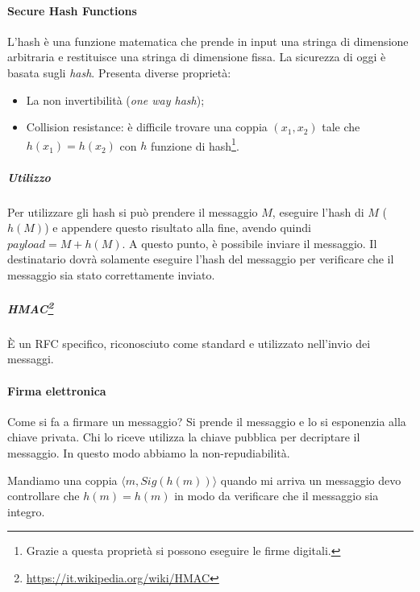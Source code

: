 \paragraph{Secure Hash Functions}

L'hash è una funzione matematica che prende in input una stringa di dimensione
arbitraria e restituisce una stringa di dimensione fissa. La sicurezza di oggi è
basata sugli \textit{hash}. Presenta diverse proprietà:
\begin{itemize}
\item La non invertibilità (\emph{one way hash});
\item Collision resistance: è difficile trovare una coppia $(x_1,x_2)$ tale che
$h(x_1) = h(x_2)$ con $h$ funzione di hash\footnote{Grazie a questa proprietà si
possono eseguire le firme digitali.}.
\end{itemize}

\subparagraph*{Utilizzo}

Per utilizzare gli hash si può prendere il messaggio $M$, eseguire l'hash di $M$
($h(M)$) e appendere questo risultato alla fine, avendo quindi $payload = M +
h(M)$. A questo punto, è possibile inviare il messaggio. Il destinatario dovrà
solamente eseguire l'hash del messaggio per verificare che il messaggio sia
stato correttamente inviato.

\subparagraph*{HMAC\footnote{\url{https://it.wikipedia.org/wiki/HMAC}}}

È un RFC specifico, riconosciuto come standard e utilizzato nell'invio dei
messaggi.


\paragraph{Firma elettronica}

Come si fa a firmare un messaggio? Si prende il messaggio e lo si esponenzia
alla chiave privata. Chi lo riceve utilizza la chiave pubblica per decriptare il
messaggio. In questo modo abbiamo la non-repudiabilità.

Mandiamo una coppia $ \langle m, Sig(h(m)) \rangle $ quando mi arriva un
messaggio devo controllare che
$h(m) = h(m)$ in modo da verificare che il messaggio sia integro.
